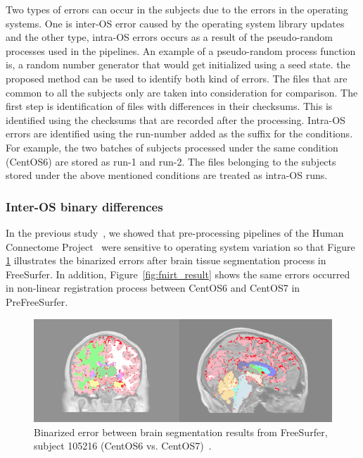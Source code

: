 \documentclass[a4paper,num-refs]{oup-contemporary}
\begin{document}
Two types of errors can occur in the subjects due to the 
errors in the operating systems. One is inter-OS error caused by the 
operating system library updates and the other type, intra-OS errors 
occurs as a result of the pseudo-random processes used in the 
pipelines. An example of a pseudo-random process function is, a random 
number generator that would get initialized using a seed state. the 
proposed method can be used to identify both kind of errors. The files 
that are common to all the subjects only are taken into consideration 
for comparison. The first step is identification of files with 
differences in their checksums. This is identified using the checksums 
that are recorded after the processing. Intra-OS errors are identified 
using the run-number added as the suffix for the conditions. For 
example, the two batches of subjects processed under the same condition 
(CentOS6) are stored as run-1 and run-2. The files belonging to the 
subjects stored under the above mentioned conditions are treated as 
intra-OS runs.


\subsubsection{Inter-OS binary differences}


In the previous study~\cite{Scaria2017}, we showed that pre-processing 
pipelines of the Human Connectome Project~\cite{Glasser2013} were 
sensitive to operating system variation so that Figure 
\ref{fig:tissue_class} illustrates the binarized errors after brain 
tissue segmentation process in FreeSurfer. In addition, 
Figure~\ref{fig:fnirt_result} shows the same errors occurred in 
non-linear registration process between CentOS6 and CentOS7 in PreFreeSurfer. 

\begin{figure}
\centering
  \includegraphics[width=\columnwidth]{images/brain_classification.png} 
  \caption{Binarized error between brain segmentation results from 
  FreeSurfer, subject 105216 (CentOS6 vs. CentOS7)~\cite{Scaria2017}.
    } 
  \label{fig:tissue_class}
\end{figure}
\end{document}
